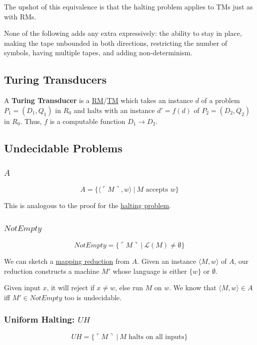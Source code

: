 \documentclass{article}
\begin{document}
The upshot of this equivalence is that the halting problem applies to TMs just as with RMs.

None of the following adds any extra expressively: the ability to stay in place, making the tape unbounded in both directions, restricting the number of symbols, having multiple tapes, and adding non-determinism.


\subsection{Turing Transducers}\label{turing-transducer}
A \textbf{Turing Transducer} is a \hyperref[rm]{RM}/\hyperref[tm]{TM} which takes an instance $d$ of a problem $P_1 = (D_1, Q_1)$ in $R_0$ and halts with an instance $d' = f(d)$ of $P_2 = (D_2, Q_2)$ in $R_0$. Thus, $f$ is a computable function $D_1 \to D_2$.


\subsection{Undecidable Problems}\label{undecidable-problems}
\subsubsection{$A$}
\[A = \{\langle \ulcorner M \urcorner, w \rangle \:|\: M \text{ accepts } w\}\]

This is analogous to the proof for the \hyperref[halting]{halting problem}.

\subsubsection{$NotEmpty$}
\[NotEmpty = \{\ulcorner M \urcorner \:|\: \mathcal{L}(M) \neq \emptyset\}\]

We can sketch a \hyperref[mapping-reduction]{mapping reduction} from $A$. Given an instance $\langle M, w \rangle$ of $A$, our reduction constructs a machine $M'$ whose language is either $\{w\}$ or $\emptyset$.

Given input $x$, it will reject if $x \neq w$, else run $M$ on $w$. We know that $\langle M, w \rangle \in A$ iff $M' \in NotEmpty$ too is undecidable.

\subsubsection{Uniform Halting: $UH$}
\[UH = \{\ulcorner M \urcorner \:|\: M \text{ halts on all inputs}\}\]
\end{document}
